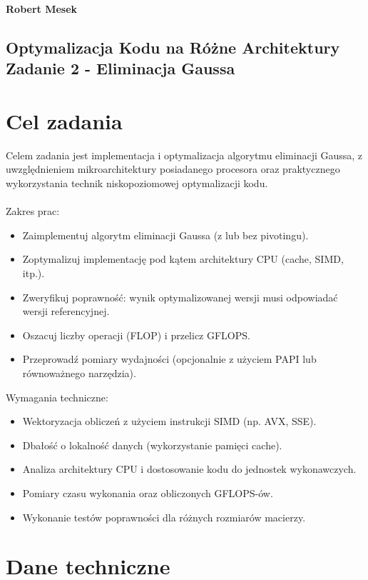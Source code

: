 \documentclass[12pt]{article}
\begin{document}
\textbf{Robert Mesek}\text{,} %
\text{ } %

\begin{center}
  \section*{Optymalizacja Kodu na Różne Architektury \\
    Zadanie 2 - Eliminacja Gaussa}
  \mbox{}
\end{center}

\section*{Cel zadania}
Celem zadania jest implementacja i optymalizacja algorytmu eliminacji Gaussa,
z uwzględnieniem mikroarchitektury posiadanego procesora oraz praktycznego
wykorzystania technik niskopoziomowej optymalizacji kodu. \\ \\
Zakres prac:
\begin{itemize}
  \item Zaimplementuj algorytm eliminacji Gaussa (z lub bez pivotingu).
  \item Zoptymalizuj implementację pod kątem architektury CPU (cache,
        SIMD, itp.).
  \item Zweryfikuj poprawność: wynik optymalizowanej wersji musi odpowiadać
        wersji referencyjnej.
  \item Oszacuj liczby operacji (FLOP) i przelicz GFLOPS.
  \item Przeprowadź pomiary wydajności (opcjonalnie z użyciem PAPI lub
        równoważnego narzędzia).
\end{itemize}
Wymagania techniczne:
\begin{itemize}
  \item Wektoryzacja obliczeń z użyciem instrukcji SIMD (np. AVX, SSE).
  \item Dbałość o lokalność danych (wykorzystanie pamięci cache).
  \item Analiza architektury CPU i dostosowanie kodu do jednostek wykonawczych.
  \item Pomiary czasu wykonania oraz obliczonych GFLOPS-ów.
  \item Wykonanie testów poprawności dla różnych rozmiarów macierzy.
\end{itemize}


\newpage

\section*{Dane techniczne}
\end{document}
